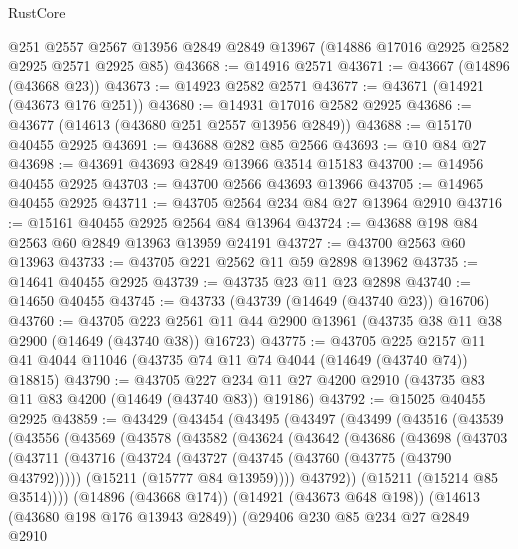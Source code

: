\begin{lexlean}{RustCore}
\begin{coremodule}
    @251
    @2557
    @2567
    @13956
    @2849
    @2849
    @13967
    (@14886 @17016 @2925 @2582 @2925 @2571 @2925 @85)
@43668 := @14916 @2571
@43671 := @43667 (@14896 (@43668 @23))
@43673 := @14923 @2582 @2571
@43677 := @43671 (@14921 (@43673 @176 @251))
@43680 := @14931 @17016 @2582 @2925
@43686 := @43677 (@14613 (@43680 @251 @2557 @13956 @2849))
@43688 := @15170 @40455 @2925
@43691 := @43688 @282 @85 @2566
@43693 := @10 @84 @27
@43698 := @43691 @43693 @2849 @13966 @3514 @15183
@43700 := @14956 @40455 @2925
@43703 := @43700 @2566 @43693 @13966
@43705 := @14965 @40455 @2925
@43711 := @43705 @2564 @234 @84 @27 @13964 @2910
@43716 := @15161 @40455 @2925 @2564 @84 @13964
@43724 := @43688 @198 @84 @2563 @60 @2849 @13963 @13959 @24191
@43727 := @43700 @2563 @60 @13963
@43733 := @43705 @221 @2562 @11 @59 @2898 @13962
@43735 := @14641 @40455 @2925
@43739 := @43735 @23 @11 @23 @2898
@43740 := @14650 @40455
@43745 := @43733 (@43739 (@14649 (@43740 @23)) @16706)
@43760 := @43705
    @223
    @2561
    @11
    @44
    @2900
    @13961
    (@43735 @38 @11 @38 @2900 (@14649 (@43740 @38)) @16723)
@43775 := @43705
    @225
    @2157
    @11
    @41
    @4044
    @11046
    (@43735 @74 @11 @74 @4044 (@14649 (@43740 @74)) @18815)
@43790 := @43705
    @227
    @234
    @11
    @27
    @4200
    @2910
    (@43735 @83 @11 @83 @4200 (@14649 (@43740 @83)) @19186)
@43792 := @15025 @40455 @2925
@43859 := @43429
    (@43454
      (@43495
        (@43497
          (@43499
            (@43516
              (@43539
                (@43556
                  (@43569
                    (@43578
                      (@43582
                        (@43624
                          (@43642
                            (@43686
                              (@43698
                                (@43703
                                  (@43711
                                    (@43716
                                      (@43724
                                        (@43727 (@43745 (@43760 (@43775 (@43790 @43792)))))
                                        (@15211 (@15777 @84 @13959))))
                                    @43792))
                                (@15211 (@15214 @85 @3514))))
                            (@14896 (@43668 @174))
                            (@14921 (@43673 @648 @198))
                            (@14613 (@43680 @198 @176 @13943 @2849))
                            (@29406
                              @230
                              @85
                              @234
                              @27
                              @2849
                              @2910

\end{coremodule}
\end{lexlean}
